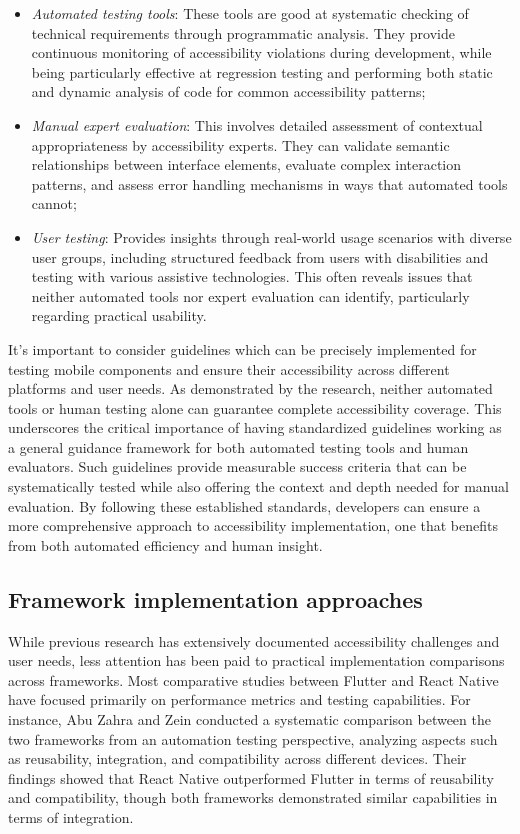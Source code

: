 \begin{itemize}
    \item \textit{Automated testing tools}: These tools are good at systematic checking of technical requirements through programmatic analysis. They provide continuous monitoring of accessibility violations during development, while being particularly effective at regression testing and performing both static and dynamic analysis of code for common accessibility patterns;
    
    \item \textit{Manual expert evaluation}: This involves detailed assessment of contextual appropriateness by accessibility experts. They can validate semantic relationships between interface elements, evaluate complex interaction patterns, and assess error handling mechanisms in ways that automated tools cannot;
    
    \item \textit{User testing}: Provides insights through real-world usage scenarios with diverse user groups, including structured feedback from users with disabilities and testing with various assistive technologies. This often reveals issues that neither automated tools nor expert evaluation can identify, particularly regarding practical usability.
\end{itemize}

It's important to consider guidelines which can be precisely implemented for testing mobile components and ensure their accessibility across different platforms and user needs. As demonstrated by the research, neither automated tools or human testing alone can guarantee complete accessibility coverage. This underscores the critical importance of having standardized guidelines working as a general guidance framework for both automated testing tools and human evaluators. Such guidelines provide measurable success criteria that can be systematically tested while also offering the context and depth needed for manual evaluation. By following these established standards, developers can ensure a more comprehensive approach to accessibility implementation, one that benefits from both automated efficiency and human insight.

\subsection{Framework implementation approaches}

While previous research has extensively documented accessibility challenges and user needs, less attention has been paid to practical implementation comparisons across frameworks. Most comparative studies between Flutter and React Native have focused primarily on performance metrics and testing capabilities. For instance, Abu Zahra and Zein \cite{zahra2022systematic} conducted a systematic comparison between the two frameworks from an automation testing perspective, analyzing aspects such as reusability, integration, and compatibility across different devices. Their findings showed that React Native outperformed Flutter in terms of reusability and compatibility, though both frameworks demonstrated similar capabilities in terms of integration. 

